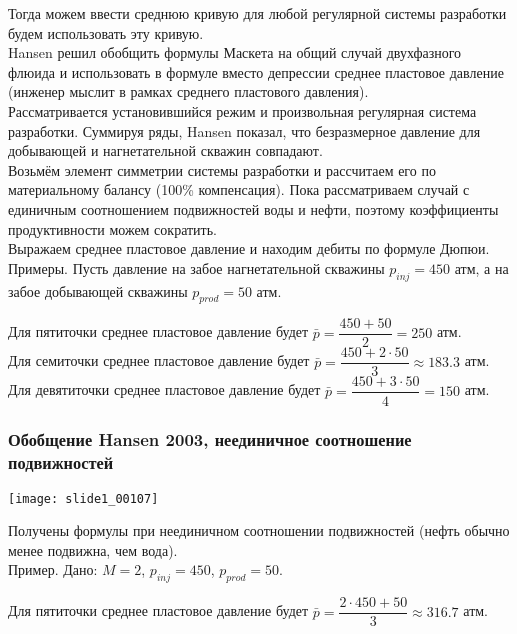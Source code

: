 \documentclass[main.tex]{subfiles}
\begin{document}
Тогда можем ввести среднюю кривую для любой регулярной системы разработки будем использовать эту кривую.\\

Hansen решил обобщить формулы Маскета на общий случай двухфазного флюида и использовать в формуле вместо депрессии среднее пластовое давление (инженер мыслит в рамках среднего пластового давления).\\

Рассматривается установившийся режим и произвольная регулярная система разработки. Суммируя ряды, Hansen показал, что безразмерное давление для добывающей и нагнетательной скважин совпадают.\\

Возьмём элемент симметрии системы разработки и рассчитаем его по материальному балансу (100\% компенсация). Пока рассматриваем случай с единичным соотношением подвижностей воды и нефти, поэтому коэффициенты продуктивности можем сократить.\\

Выражаем среднее пластовое давление и находим дебиты по формуле Дюпюи.\\

Примеры.
Пусть давление на забое нагнетательной скважины $p_{inj}=450$ атм, а на забое добывающей скважины $p_{prod}=50$ атм.

Для пятиточки среднее пластовое давление будет $\bar{p}=\dfrac{450+50}{2}=250$ атм.\\

Для семиточки среднее пластовое давление будет $\bar{p}=\dfrac{450+2\cdot50}{3}\approx183.3$ атм.\\

Для девятиточки среднее пластовое давление будет $\bar{p}=\dfrac{450+3\cdot50}{4}=150$ атм.

\subsubsection{Обобщение Hansen 2003, неединичное соотношение подвижностей}

\texttt{[image: slide1\_00107]}

Получены формулы при неединичном соотношении подвижностей (нефть обычно менее подвижна, чем вода).\\

Пример.
Дано: $M=2$, $p_{inj}=450$, $p_{prod}=50$.

Для пятиточки среднее пластовое давление будет $\bar{p}=\dfrac{2\cdot450+50}{3}\approx316.7$ атм.\\
\end{document}
